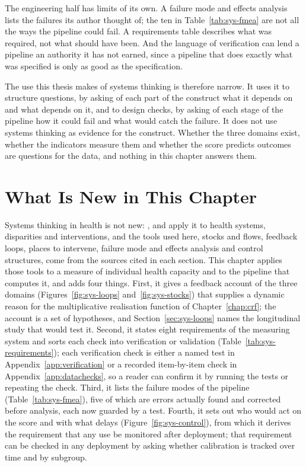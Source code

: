 The engineering half has limits of its own. A failure mode and effects
analysis lists the failures its author thought of; the ten in
Table~\ref{tab:sys-fmea} are not all the ways the pipeline could fail. A
requirements table describes what was required, not what should have been.
And the language of verification can lend a pipeline an authority it has not
earned, since a pipeline that does exactly what was specified is only as good
as the specification.

The use this thesis makes of systems thinking is therefore narrow. It uses it
to structure questions, by asking of each part of the construct what it
depends on and what depends on it, and to design checks, by asking of each
stage of the pipeline how it could fail and what would catch the failure. It
does not use systems thinking as evidence for the construct. Whether the three
domains exist, whether the indicators measure them and whether the score
predicts outcomes are questions for the data, and nothing in this chapter
answers them.

\section*{What Is New in This Chapter}

Systems thinking in health is not new: \citet{peters_2014},
\citet{diez_roux_2011} and \citet{rutter_2017} apply it to health systems,
disparities and interventions, and the tools used here, stocks and flows,
feedback loops, places to intervene, failure mode and effects analysis and
control structures, come from the sources cited in each section. This chapter
applies those tools to a measure of individual health capacity and to the
pipeline that computes it, and adds four things. First, it gives a feedback
account of the three domains (Figures~\ref{fig:sys-loops}
and~\ref{fig:sys-stocks}) that supplies a dynamic reason for the
multiplicative realisation function of Chapter~\ref{chap:crf}; the account is
a set of hypotheses, and Section~\ref{sec:sys-loops} names the longitudinal
study that would test it. Second, it states eight requirements of the measuring
system and sorts each check into verification or validation
(Table~\ref{tab:sys-requirements}); each verification check is either a
named test in Appendix~\ref{app:verification} or a recorded item-by-item check
in Appendix~\ref{app:datachecks}, so a reader can confirm it by running the
tests or repeating the check. Third, it lists the failure modes of the pipeline
(Table~\ref{tab:sys-fmea}), five of which are errors actually found and
corrected before analysis, each now guarded by a test. Fourth, it sets out who
would act on the score and with what delays (Figure~\ref{fig:sys-control}),
from which it derives the requirement that any use be monitored after
deployment; that requirement can be checked in any deployment by asking
whether calibration is tracked over time and by subgroup.

